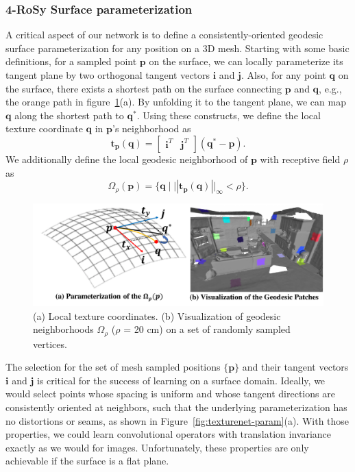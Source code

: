 \subsubsection{4-RoSy Surface parameterization}
\label{sec:texturenet-approach-param}
 A critical aspect of our network is to define a consistently-oriented geodesic surface parameterization for any position on a 3D mesh. Starting with some basic definitions, for a sampled point $\mathbf{p}$ on the surface, we can locally parameterize its tangent plane by two orthogonal tangent vectors $\mathbf{i}$ and $\mathbf{j}$.  Also, for any point $\mathbf{q}$ on the surface, there exists a shortest path on the surface connecting $\mathbf{p}$ and $\mathbf{q}$, e.g., the orange path in figure~\ref{fig:texturenet-geodesic}(a). By unfolding it to the tangent plane, we can map $\mathbf{q}$ along the shortest path to $\mathbf{q^*}$.   Using these constructs, we define the local texture coordinate $\mathbf{q}$ in $\mathbf{p}$'s neighborhood as
 \begin{equation*}
     \mathbf{t}_{\mathbf{p}}(\mathbf{q}) = \begin{bmatrix}
     \mathbf{i}^T & \mathbf{j}^T
     \end{bmatrix}(\mathbf{q}^*-\mathbf{p}).
 \end{equation*}
 We additionally define the local geodesic neighborhood of $\mathbf{p}$ with receptive field $\rho$ as
\begin{equation}
\Omega_\rho(\mathbf{p}) = \{\mathbf{q}\;|\;||\mathbf{t}_{\mathbf{p}}(\mathbf{q})||_\infty < \rho\}.
\label{eq:texturenet-omega}
\end{equation}
\begin{figure}
    \centering
    \includegraphics[width=0.8\linewidth]{texturenet/geodesic/neighbor.pdf}
    \caption{(a) Local texture coordinates. (b) Visualization of geodesic neighborhoods $\Omega_\rho$ ($\rho$ = 20 cm) on a set of randomly sampled vertices.}
    \label{fig:texturenet-geodesic}
\end{figure}
The selection for the set of mesh sampled positions $\{\mathbf{p}\}$ and their tangent vectors $\mathbf{i}$ and $\mathbf{j}$ is critical for the success of learning on a surface domain.  Ideally, we would select points whose spacing is uniform and whose tangent directions are consistently oriented at neighbors, such that the underlying parameterization has no distortions or seams, as shown in Figure~\ref{fig:texturenet-param}(a).  With those properties, we could learn convolutional operators with translation invariance exactly as we would for images.  Unfortunately, these properties are only achievable if the surface is a flat plane.   
